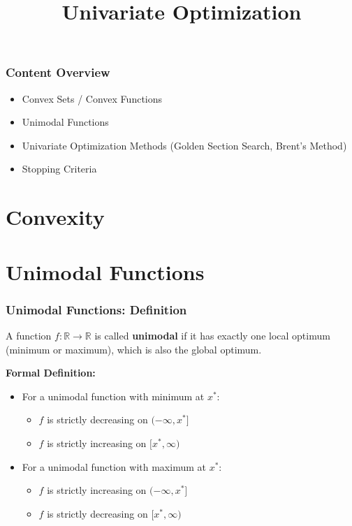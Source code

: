\documentclass{beamer}
\title{Univariate Optimization}
\begin{document}
\begin{frame}
\titlepage
\end{frame}

\begin{frame}
\frametitle{Content Overview}
\begin{itemize}
    \item Convex Sets / Convex Functions
    \item Unimodal Functions
    \item Univariate Optimization Methods (Golden Section Search, Brent's Method)
    \item Stopping Criteria
\end{itemize}
\end{frame}

\section{Convexity}





\section{Unimodal Functions}

\begin{frame}
\frametitle{Unimodal Functions: Definition}
\begin{definition}
A function $f: \mathbb{R} \to \mathbb{R}$ is called \textbf{unimodal} if it has exactly one local optimum (minimum or maximum), which is also the global optimum.
\end{definition}

\vspace{0.5cm}

\textbf{Formal Definition:}
\begin{itemize}
    \item For a unimodal function with minimum at $x^*$:
    \begin{itemize}
        \item $f$ is strictly decreasing on $(-\infty, x^*]$
        \item $f$ is strictly increasing on $[x^*, \infty)$
    \end{itemize}
    \item For a unimodal function with maximum at $x^*$:
    \begin{itemize}
        \item $f$ is strictly increasing on $(-\infty, x^*]$
        \item $f$ is strictly decreasing on $[x^*, \infty)$
    \end{itemize}
\end{itemize}
\end{frame}
\end{document}
